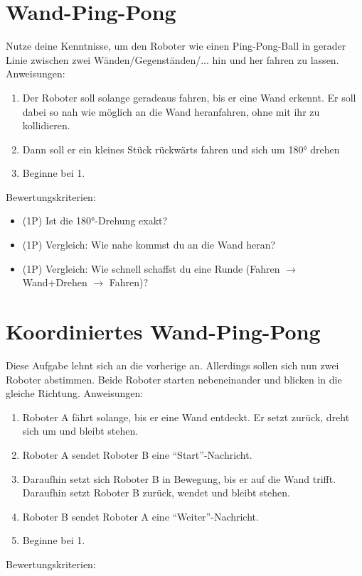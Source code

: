 \documentclass[
	12pt,
	article,
	type=bsc, %
	colorbacktitle,
	instlogo,
	accentcolor=tud1c,
	german,
	twoside
]{tudexercise}
\begin{document}
	\newpage
	\section{Wand-Ping-Pong}
	Nutze deine Kenntnisse, um den Roboter wie einen Ping-Pong-Ball in gerader Linie zwischen zwei Wänden/Gegenständen/... hin und her fahren zu lassen.
	Anweisungen:
	\begin{enumerate}
	\item Der Roboter soll solange geradeaus fahren, bis er eine Wand erkennt. Er soll dabei so nah wie möglich an die Wand heranfahren, ohne mit ihr zu kollidieren.
	\item Dann soll er ein kleines Stück rückwärts fahren und sich um 180° drehen
	\item Beginne bei 1.
	\end{enumerate}
	
	Bewertungskriterien:
	\begin{itemize}
	\item (1P) Ist die 180°-Drehung exakt?
	\item (1P) Vergleich: Wie nahe kommst du an die Wand heran?
	\item (1P) Vergleich: Wie schnell schaffst du eine Runde (Fahren $\rightarrow$ Wand+Drehen $\rightarrow$ Fahren)?
	\end{itemize}
	
	\section{Koordiniertes Wand-Ping-Pong}
	Diese Aufgabe lehnt sich an die vorherige an. Allerdings sollen sich nun zwei Roboter abstimmen. Beide Roboter starten nebeneinander und blicken in die gleiche Richtung.
	Anweisungen:
	\begin{enumerate}
	\item Roboter A fährt solange, bis er eine Wand entdeckt. Er setzt zurück, dreht sich um und bleibt stehen.
	\item Roboter A sendet Roboter B eine “Start”-Nachricht.
	\item Daraufhin setzt sich Roboter B in Bewegung, bis er auf die Wand trifft. Daraufhin setzt Roboter B zurück, wendet und bleibt stehen.
	\item Roboter B sendet Roboter A eine “Weiter”-Nachricht.
	\item Beginne bei 1.
	\end{enumerate}
	
	Bewertungskriterien:
	
\end{document}
